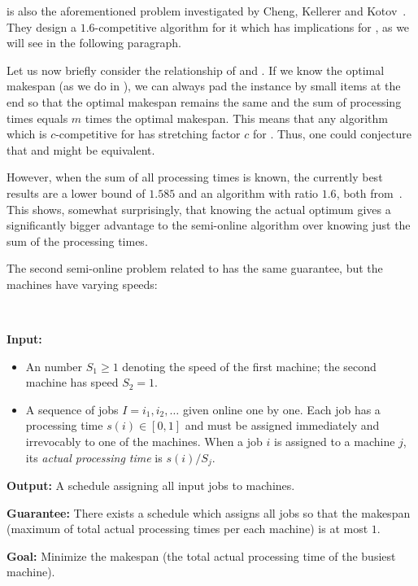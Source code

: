 \schedulingtpt is also the aforementioned problem investigated by
Cheng, Kellerer and Kotov~\cite{cheng05}. They design a $1.6$-competitive
algorithm for it which has implications for \binstretch, as we will
see in the following paragraph.

Let us now briefly consider the relationship of \binstretch and
\schedulingtpt. If we know the optimal makespan (as we do in
\binstretch), we can always pad the instance by small items at the end
so that the optimal makespan remains the same and the sum of
processing times equals $m$ times the optimal makespan. This means
that any algorithm which is $c$-competitive for \schedulingtpt has
stretching factor $c$ for \binstretch. Thus, one could conjecture that
\binstretch and \schedulingtpt might be equivalent.

However, when the sum of all processing times is known, the currently
best results are a lower bound of $1.585$ and an algorithm with ratio
$1.6$, both from~\cite{DBLP:journals/tcs/AlbersH12}. This shows,
somewhat surprisingly, that knowing the actual optimum gives a
significantly bigger advantage to the semi-online algorithm over
knowing just the sum of the processing times.

The second semi-online problem related to \binstretch has the same
guarantee, but the machines have varying speeds:

\begin{prb}~
\label{prb:schedulingtpt}

\smallskip

\noindent\textbf{Input:}

\begin{itemize}
\item An number $S_1 \ge 1$ denoting the speed of the first machine;
the second machine has speed $S_2 = 1$.
\item A sequence of jobs $I=i_1, i_2, \ldots$ given online one by one. Each job has
a processing time $s(i) \in [0,1]$ and must be assigned immediately and irrevocably
to one of the machines. When a job $i$ is assigned to a machine $j$, its \emph{actual processing
time} is $s(i)/S_j$.
\end{itemize}

\noindent\textbf{Output:} A schedule assigning all input jobs to machines.

\noindent\textbf{Guarantee:} There exists a schedule which assigns all
jobs so that the makespan (maximum of total actual processing times
per each machine) is at most $1$.

\noindent\textbf{Goal:} Minimize the makespan (the total actual
processing time of the busiest machine).

\noindent
\smallskip
\end{prb}

